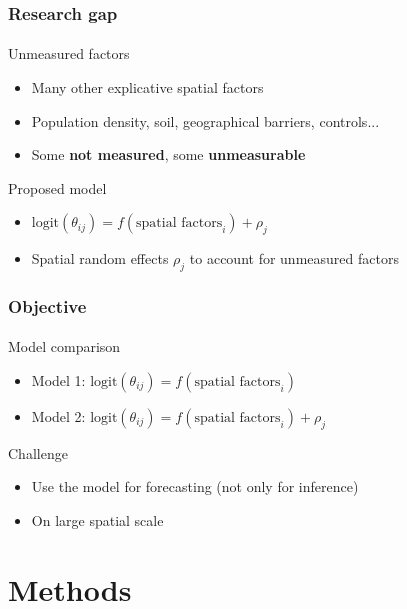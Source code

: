 \documentclass[slidetop,10pt,dvipsnames,leqno,fleqn]{beamer} %
\newcommand{\logit}{\text{logit}}
\begin{document}
\begin{frame}
  \frametitle{Research gap}
  \framesubtitle{}
  \begin{block}{Unmeasured factors}
    \begin{itemize}
    \item Many other explicative spatial factors
    \item Population density, soil, geographical barriers, controls... 
    \item Some \textbf{not measured}, some \textbf{unmeasurable}
    \end{itemize}
  \end{block}
  \begin{block}{Proposed model}
    \begin{itemize}
    \item $\logit(\theta_{ij}) = f(\text{spatial factors}_i) + \rho_j$
    \item Spatial random effects $\rho_j$ to account for unmeasured factors
    \end{itemize}
  \end{block}
\end{frame}

\begin{frame}
  \frametitle{Objective}
  \framesubtitle{}
  \begin{block}{Model comparison}
    \begin{itemize}
    \item Model 1: $\logit(\theta_{ij}) = f(\text{spatial factors}_i)$
    \item Model 2: $\logit(\theta_{ij}) = f(\text{spatial factors}_i) + \rho_j$
    \end{itemize}
  \end{block}
  \begin{block}{Challenge}
    \begin{itemize}
    \item Use the model for forecasting (not only for inference)
    \item On large spatial scale
    \end{itemize}
  \end{block}
\end{frame}

\section{Methods}
\end{document}
